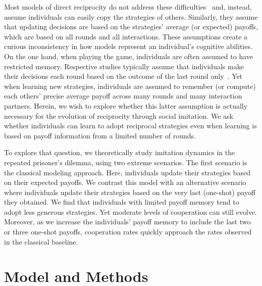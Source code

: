 \documentclass[11pt]{article}
\theoremstyle{plainCl1}
\theoremstyle{plainCl2}
\begin{document}
Most models of direct reciprocity do not address these difficulties~\citep{brauchli:JTB:1999,brandt:JTB:2006,ohtsuki:JTB:2007b,szolnoki:pre:2009b,imhof2010stochastic,van-segbroeck:prl:2012,grujic:jtb:2012,Martinez2012,stewart:pnas:2013,pinheiro:PLoSCB:2014,stewart:games:2015,Baek2016,McAvoy:ProcA:2019,glynatsi:SCR:2020,Schmid:PlosCB:2022,Murase:SciRep:2022,Cooney:BMB:2022,Chen:PNASNexus:2023} and, instead, assume individuals can easily copy the strategies of others. 
Similarly, they assume that updating decisions are based on the strategies' average (or expected) payoffs, which are based on all rounds and all interactions. 
These assumptions create a curious inconsistency in how models represent an individual's cognitive abilities. 
On the one hand, when playing the game, individuals are often assumed to have restricted memory. 
Respective studies typically assume that individuals make their decisions each round based on the outcome of the last round only~\citep[with only a few exceptions, see Refs.][]{Hauert1997,van-veelen:PNAS:2012,Stewart2016,hilbe:PNAS:2017,Li:NatCS:2022,Murase:PLoSCompBio:2023a}. 
Yet when learning new strategies, individuals are assumed to remember (or compute) each others' precise average payoff across many rounds and many interaction partners. 
Herein, we wish to explore whether this latter assumption is actually necessary for the evolution of reciprocity through social imitation. 
We ask whether individuals can learn to adopt reciprocal strategies even when learning is based on payoff information from a limited number of rounds. 


To explore that question, we theoretically study imitation dynamics in the repeated prisoner's dilemma, using two extreme scenarios. 
The first scenario is the classical modeling approach. 
Here, individuals update their strategies based on their expected payoffs. 
We contrast this model with an alternative scenario where individuals update their strategies based on the very
last (one-shot) payoff they obtained. 
We find that individuals with limited payoff memory tend to adopt less generous strategies. 
Yet moderate levels of cooperation can still evolve. 
Moreover, as we increase the individuals' payoff memory to include the last two or three one-shot payoffs, cooperation rates quickly approach the rates observed in the classical baseline. 




\section{Model and Methods}\label{section:model}
\end{document}
